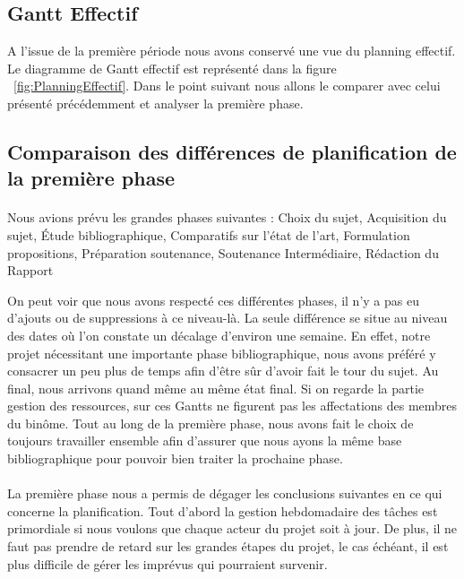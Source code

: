 \documentclass[11pt, french,screen]{report-rd-info}
\begin{document}
\subsection{Gantt Effectif}
A l'issue de la première période nous avons conservé une vue du planning effectif. Le diagramme de Gantt effectif est représenté dans la figure ~\ref{fig:PlanningEffectif}. Dans le point suivant nous allons le comparer avec celui présenté précédemment et analyser la première phase.

\subsection{Comparaison des différences de planification de la première phase}
\paragraph*{}
Nous avions prévu les grandes phases suivantes : Choix du sujet, Acquisition du sujet, Étude bibliographique, Comparatifs sur l'état de l'art, Formulation propositions, Préparation soutenance, Soutenance Intermédiaire, Rédaction du Rapport

On peut voir que nous avons respecté ces différentes phases, il n’y a pas eu d’ajouts ou de suppressions à ce niveau-là. La seule différence se situe au niveau des dates où l’on constate un décalage d’environ une semaine. En effet, notre projet nécessitant une importante phase bibliographique, nous avons préféré y consacrer un peu plus de temps afin d’être sûr d’avoir fait le tour du sujet. Au final, nous arrivons quand même au même état final. Si on regarde la partie gestion des ressources, sur ces Gantts ne figurent pas les affectations des membres du binôme. Tout au long de la première phase, nous avons fait le choix de toujours travailler ensemble afin d’assurer que nous ayons la même base bibliographique pour pouvoir bien traiter la prochaine phase.

\paragraph*{}
La première phase nous a permis de dégager les conclusions suivantes en ce qui concerne la planification. Tout d’abord la gestion hebdomadaire des tâches est primordiale si nous voulons que chaque acteur du projet soit à jour. De plus, il ne faut pas prendre de retard sur les grandes étapes du projet, le cas échéant, il est plus difficile de gérer les imprévus qui pourraient survenir. 
\end{document}
